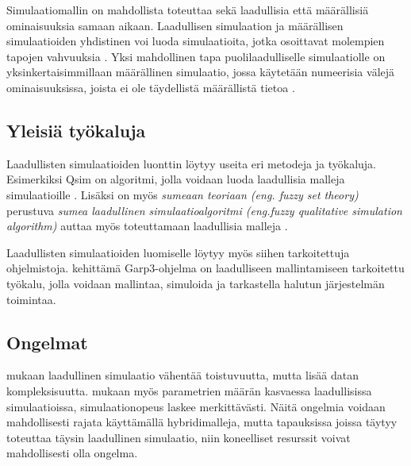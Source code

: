 \documentclass[utf8]{gradu3}
\begin{document}
Simulaatiomallin on mahdollista toteuttaa sekä laadullisia että määrällisiä ominaisuuksia samaan aikaan. Laadullisen simulaation ja määrällisen simulaatioiden yhdistinen voi luoda simulaatioita, jotka osoittavat molempien tapojen vahvuuksia \parencite{semiHybrid1997qualitative}. Yksi mahdollinen tapa puolilaadulliselle simulaatiolle on yksinkertaisimmillaan määrällinen simulaatio, jossa käytetään numeerisia välejä ominaisuuksissa, joista ei ole täydellistä määrällistä tietoa \parencite{semiHybrid1997qualitative}.

\subsection{Yleisiä työkaluja}
\begin{comment}
    Tämäkin on hyvin pintapuolinen. Pari esimerkkiä joita ei sidota kovinkaan hyvin simuloinnin tavoitteisiin tai työkaluilta odotettuihin ominaisuuksiin.
\end{comment}
Laadullisten simulaatioiden luonttin löytyy useita eri metodeja ja työkaluja.
Esimerkiksi Qsim on algoritmi, jolla voidaan luoda laadullisia malleja simulaatioille
\parencite{kuipers1986qualitative}. 
Lisäksi on myös \textit{sumeaan teoriaan (eng. fuzzy set theory)} 
perustuva \textit{sumea laadullinen simulaatioalgoritmi 
(eng.fuzzy qualitative simulation algorithm)} 
auttaa myös toteuttamaan laadullisia malleja \parencite{shen1993fuzzy}.

Laadullisten simulaatioiden luomiselle löytyy myös siihen tarkoitettuja ohjelmistoja.
\textcite{bredeweg2007garp3} kehittämä Garp3-ohjelma on laadulliseen 
mallintamiseen tarkoitettu työkalu, jolla voidaan mallintaa, simuloida ja
tarkastella halutun järjestelmän toimintaa.

\subsection{Ongelmat}
\begin{comment}
Mietin tämän roolia tässä kohtaa työtä kun itse tutkimuskysymystäkään ei ole kunnolla avattu (ja kun kysymyksistä ongelmat loistavat poissaolollaan).

Hybridimallit jäävät ilmaan. Minkä hybirideistä on kyse? Ylipäätään ei ole mitään kuvaa siitä, miten laadullista simulointia tehdään (millaisia ovat mallit ja niiden rakenteet, miten niillä simuloidaan). Tällöin parametreista ja nopeudesta puhuminen menee lukijalta täysin yli.
\end{comment}
\textcite{QualSimTheoryApplications2013} mukaan laadullinen simulaatio vähentää
toistuvuutta, mutta lisää datan kompleksisuutta.
\textcite{QualSimTheoryApplications2013} mukaan myös parametrien 
määrän kasvaessa laadullisissa simulaatioissa, 
simulaationopeus laskee merkittävästi. 
Näitä ongelmia voidaan mahdollisesti rajata käyttämällä hybridimalleja, mutta 
tapauksissa joissa täytyy toteuttaa täysin laadullinen simulaatio, 
niin koneelliset resurssit voivat mahdollisesti olla ongelma. 
\end{document}
